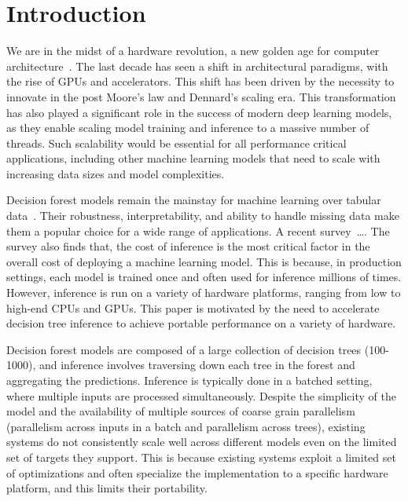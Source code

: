 \section{Introduction}
\label{sec:intro}
We are in the midst of a hardware revolution, a new golden age for computer architecture~\cite{GoldenAge}. The last 
decade has seen a shift in architectural paradigms, with the rise of GPUs and accelerators. This shift has been driven
by the necessity to innovate in the post Moore's law and Dennard's scaling era. This transformation has also played 
a significant role in the success of modern deep learning models, as they enable scaling model training and inference 
to a massive number of threads. Such scalability would be essential for all performance critical applications, including
other machine learning models that need to scale with increasing data sizes and model complexities. 

Decision forest models remain the mainstay for machine learning over tabular data~\cite{DLNotAllYouNeed,TreebasedOutperformDL}. 
Their robustness, interpretability, and ability to handle missing data make them a popular choice for a wide range of applications. 
A recent survey~\cite{kaggle}\dots. 
The survey also finds that, the cost of inference is the most critical factor in the overall cost of deploying a machine learning model.
This is because, in production settings, each model is trained once and often used for inference millions of times. 
However, inference is run on a variety of hardware platforms, ranging from low to high-end CPUs and GPUs. 
This paper is motivated by the need to accelerate decision tree inference to achieve portable performance on a variety of hardware.

Decision forest models are composed of a large collection of decision trees (100-1000), and inference involves 
traversing down each tree in the forest and aggregating the predictions. Inference is typically done in a batched
setting, where multiple inputs are processed simultaneously.
Despite the simplicity of the model and the availability of multiple sources of coarse grain parallelism (parallelism 
across inputs in a batch and parallelism across trees), existing systems do not consistently scale well across different
models even on the limited set of targets they support. 
This is because existing systems exploit a limited set of optimizations and often specialize the implementation 
to a specific hardware platform, and this limits their portability. 

